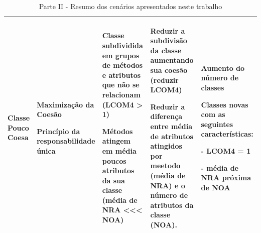 \begin{landscape}
\begin{table}[hbt]
\begin{tabular}{|p{3cm}|p{4.5cm}|p{5.0cm}|p{5.5cm}|p{5.0cm}|}
\hline 
Classe Pouco Coesa
& \begin{my_itemize}
    \item Maximização da Coesão
	\item Princípio da responsabilidade única
  \end{my_itemize}
& \begin{my_itemize}                            
    \item Classe subdividida em grupos de métodos e atributos que não se relacionam (LCOM4 > 1)
	\item Métodos atingem em média poucos atributos da sua classe (média de NRA <<< NOA)
  \end{my_itemize}
& \begin{my_itemize}
	\item Reduzir a subdivisão da classe aumentando sua coesão (reduzir LCOM4)
	\item Reduzir a diferença entre média de atributos atingidos por meetodo (média de NRA) e o número de atributos da classe (NOA).
  \end{my_itemize}
& \begin{my_itemize}                           
	\item Aumento do número de classes
	\item Classes novas com as seguintes características:
		\item[-] LCOM4 = 1
		\item[-] média de NRA próxima de NOA
  \end{my_itemize}
\tabularnewline                              
       


 
\hline
\end{tabular}
\caption{Parte II - Resumo dos cenários apresentados neste trabalho}
\end{table}

\end{landscape}

